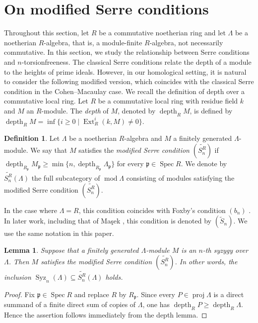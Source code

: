 \documentclass{amsart}
\newtheorem{lem}[thm]{Lemma}
\theoremstyle{definition}
\newtheorem{dfn}[thm]{Definition}
\theoremstyle{remark}
\numberwithin{equation}{thm}
\def\depth{\operatorname{depth}}
\def\Ext{\operatorname{Ext}}
\def\ge{\geqslant}
\def\mod{\operatorname{mod}}
\def\p{\mathfrak{p}}
\def\proj{\operatorname{proj}}
\def\spec{\operatorname{Spec}}
\def\Syz{\operatorname{Syz}}
\begin{document}
\section{On modified Serre conditions}
Throughout this section, let $R$ be a commutative noetherian ring and let $\Lambda$ be a noetherian $R$-algebra, that is, a module-finite $R$-algebra, not necessarily commutative.
In this section, we study the relationship between Serre conditions and $n$-torsionfreeness. The classical Serre conditions relate the depth of a module to the heights of prime ideals.
However, in our homological setting, it is natural to consider the following modified version, which coincides with the classical Serre condition in the Cohen--Macaulay case.
We recall the definition of depth over a commutative local ring.
Let $R$ be a commutative local ring with residue field $k$ and $M$ an $R$-module.
The {\em depth} of $M$, denoted by $\depth_R M$, is defined by $\depth_R M=\inf\{i\ge0\mid\Ext^i_R(k,M)\ne0\}$.

\begin{dfn}\label{modSer}
Let $\Lambda$ be a noetherian $R$-algebra and $M$ a finitely generated $\Lambda$-module. We say that $M$ satisfies the \textit{modified Serre condition} $(\widetilde{S_n^R})$ if $\depth_{R_\p} M_\p \ge \min\{n,\depth_{R_\p} \Lambda_\p\}$ for every $\p\in\spec R$.
We denote by $\widetilde{S_n^R}(\Lambda)$ the full subcategory of $\mod\Lambda$ consisting of modules satisfying the modified Serre condition $(\widetilde{S_n^R})$.
\end{dfn}

In the case where $\Lambda=R$, this condition coincides with Foxby's condition $(b_n)$ \cite{Fox}. In later work, including that of Ma\c{s}ek \cite{Masek}, this condition is denoted by $(\widetilde{S}_n)$. We use the same notation in this paper.

\begin{lem}\label{syzsn}
Suppose that a finitely generated $\Lambda$-module $M$ is an $n$-th syzygy over $\Lambda$. Then $M$ satisfies the modified Serre condition $(\widetilde{S_n^R})$. In other words, the inclusion $\Syz_n(\Lambda)\subseteq \widetilde{S_n^R}(\Lambda)$ holds.
\end{lem}
\begin{proof}
Fix $\p\in\spec R$ and replace $R$ by $R_\p$. Since every $P\in\proj\Lambda$ is a direct summand of a finite direct sum of copies of $\Lambda$, one has $\depth_R P\ge \depth_R\Lambda$. Hence the assertion follows immediately from the depth lemma.
\end{proof}
\end{document}
